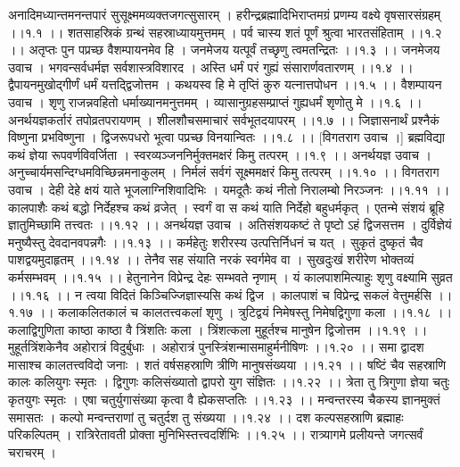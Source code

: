 \documentclass[11pt]{book}
\begin{document}
\begin{landscape}
\devanagarifont

अनादिमध्यान्तमनन्तपारं
सुसूक्ष्ममव्यक्तजगत्सुसारम् ।
हरीन्द्रब्रह्मादिभिराप्तमग्रं
प्रणम्य वक्ष्ये वृषसारसंग्रहम् ।।१.१ ।।
शतसाहस्रिकं ग्रन्थं सहस्राध्यायमुत्तमम् ।
पर्व चास्य शतं पूर्णं श्रुत्वा भारतसंहिताम् ।।१.२ ।।
अतृप्तः पुन पप्रच्छ वैशम्पायनमेव हि ।
जनमेजय यत्पूर्वं तच्छृणु त्वमतन्द्रितः ।।१.३ ।।
जनमेजय उवाच ।
भगवन्सर्वधर्मज्ञ सर्वशास्त्रविशारद ।
अस्ति धर्मं परं गुह्यं संसारार्णवतारणम् ।।१.४ ।।
द्वैपायनमुखोद्गीर्णं धर्मं यत्तद्द्विजोत्तम ।
कथयस्व हि मे तृप्तिं कुरु यत्नात्तपोधन ।।१.५ ।।
वैशम्पायन उवाच ।
शृणु राजन्नवहितो धर्माख्यानमनुत्तमम् ।
व्यासानुग्रहसम्प्राप्तं गुह्यधर्मं शृणोतु मे ।।१.६ ।।
अनर्थयज्ञकर्तारं तपोव्रतपरायणम् ।
शीलशौचसमाचारं सर्वभूतदयापरम् ।।१.७ ।।
जिज्ञासनार्थं प्रश्नैकं विष्णुना प्रभविष्णुना ।
द्विजरूपधरो भूत्वा पप्रच्छ विनयान्वितः ।।१.८ ।।
[विगतराग उवाच ।]
ब्रह्मविद्या कथं ज्ञेया रूपवर्णविवर्जिता ।
स्वरव्यञ्जननिर्मुक्तमक्षरं किमु तत्परम् ।।१.९ ।।
अनर्थयज्ञ उवाच ।
अनुच्चार्यमसन्दिग्धमविच्छिन्नमनाकुलम् ।
निर्मलं सर्वगं सूक्ष्ममक्षरं किमु तत्परम् ।।१.१० ।।
विगतराग उवाच ।
देही देहे क्षयं याते भूजलाग्निशिवादिभिः ।
यमदूतैः कथं नीतो निरालम्बो निरञ्जनः ।।१.११ ।।
कालपाशैः कथं बद्धो निर्देहश्च कथं व्रजेत् ।
स्वर्गं वा स कथं याति निर्देहो बहुधर्मकृत् ।
एतन्मे संशयं ब्रूहि ज्ञातुमिच्छामि तत्त्वतः ।।१.१२ ।।
अनर्थयज्ञ उवाच ।
अतिसंशयकष्टं ते पृष्टो ऽहं द्विजसत्तम ।
दुर्विज्ञेयं मनुष्यैस्तु देवदानवपन्नगैः ।।१.१३ ।।
कर्महेतुः शरीरस्य उत्पत्तिर्निधनं च यत् ।
सुकृतं दुष्कृतं चैव पाशद्वयमुदाहृतम् ।।१.१४ ।।
तेनैव सह संयाति नरकं स्वर्गमेव वा ।
सुखदुःखं शरीरेण भोक्तव्यं कर्मसम्भवम् ।।१.१५ ।।
हेतुनानेन विप्रेन्द्र देहः सम्भवते नृणाम् ।
यं कालपाशमित्याहुः शृणु वक्ष्यामि सुव्रत ।।१.१६ ।।
न त्वया विदितं किञ्चिज्जिज्ञास्यसि कथं द्विज ।
कालपाशं च विप्रेन्द्र सकलं वेत्तुमर्हसि ।।१.१७ ।।
कलाकलितकालं च कालतत्त्वकलां शृणु ।
त्रुटिद्वयं निमेषस्तु निमेषद्विगुणा कला ।।१.१८ ।।
कलाद्विगुणिता काष्ठा काष्ठा वै त्रिंशतिः कला ।
त्रिंशत्कला मुहूर्तश्च मानुषेन द्विजोत्तम ।।१.१९ ।।
मुहूर्तत्रिंशकेनैव अहोरात्रं विदुर्बुधाः ।
अहोरात्रं पुनस्त्रिंशन्मासमाहुर्मनीषिणः ।।१.२० ।।
समा द्वादश मासाश्च कालतत्त्वविदो जनाः ।
शतं वर्षसहस्राणि त्रीणि मानुषसंख्यया ।।१.२१ ।।
षष्टिं चैव सहस्राणि कालः कलियुगः स्मृतः ।
द्विगुणः कलिसंख्यातो द्वापरो युग संज्ञितः ।।१.२२ ।।
त्रेता तु त्रिगुणा ज्ञेया चतुः कृतयुगः स्मृतः ।
एषा चतुर्युगासंख्या कृत्वा वै ह्येकसप्ततिः ।।१.२३ ।।
मन्वन्तरस्य चैकस्य ज्ञानमुक्तं समासतः ।
कल्पो मन्वन्तराणां तु चतुर्दश तु संख्यया ।।१.२४ ।।
दश कल्पसहस्राणि ब्रह्माहः परिकल्पितम् ।
रात्रिरेतावती प्रोक्ता मुनिभिस्तत्त्वदर्शिभिः ।।१.२५ ।।
रात्र्यागमे प्रलीयन्ते जगत्सर्वं चराचरम् ।

\end{landscape}
\end{document}
